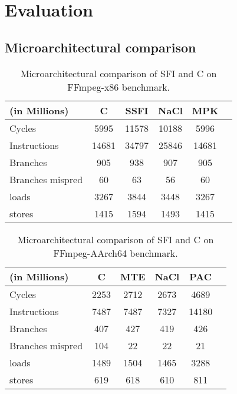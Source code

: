 \chapter{Evaluation} 

\label{Chapter5}


\section{Microarchitectural comparison}

\begin{table}[!htbp]
    \begin{small}
    \begin{center}
  \begin{tabular}{| l | c | c | c | c | c |}
  \hline
  (in Millions)    & C   & SSFI   & NaCl & MPK   \\
  \hline
  \hline
  Cycles           & 5995 & 11578  & 10188 & 5996  \\
  Instructions     & 14681  & 34797  & 25846 & 14681 \\
  Branches         & 905   & 938   & 907  & 905   \\
  Branches mispred & 60   & 63    & 56   & 60    \\
  loads            & 3267  & 3844  & 3448 & 3267  \\
  stores           & 1415  & 1594   & 1493  & 1415   \\
  \hline
  \end{tabular}
  \end{center}
\end{small}
  \caption{Microarchitectural comparison of SFI and C on FFmpeg-x86 benchmark.}
  \label{table:micro-ffmpeg-x86}
  \end{table}


\begin{table}[!htbp]
    \begin{small}
    \begin{center}
  \begin{tabular}{| l | c | c | c | c | c |}
  \hline
  (in Millions)    & C   & MTE   & NaCl & PAC   \\
  \hline
  \hline
  Cycles           & 2253 & 2712  & 2673 & 4689  \\
  Instructions     & 7487  & 7487  & 7327 & 14180 \\
  Branches         & 407   & 427   & 419  & 426   \\
  Branches mispred & 104   & 22    & 22   & 21    \\
  loads            & 1489  & 1504  & 1465 & 3288  \\
  stores           & 619  & 618   & 610  & 811   \\
  \hline
  \end{tabular}
  \end{center}
\end{small}
  \caption{Microarchitectural comparison of SFI and C on FFmpeg-AArch64 benchmark.}
  \label{table:micro-ffmpeg-arm}
  \end{table}
